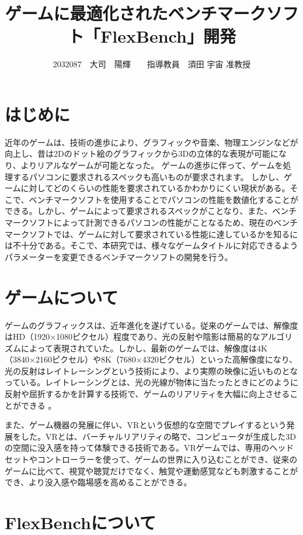 \documentclass[twocolumn,10pt,a4j]{ltjsarticle}
\title{ゲームに最適化されたベンチマークソフト「FlexBench」開発}
\author{2032087　大司　陽輝　　指導教員　須田 宇宙 准教授}
\date{}
\begin{document}
\maketitle

\section{はじめに}

近年のゲームは、技術の進歩により、グラフィックや音楽、物理エンジンなどが向上し、昔は2Dのドット絵のグラフィックから3Dの立体的な表現が可能になり、よりリアルなゲームが可能となった。
ゲームの進歩に伴って、ゲームを処理するパソコンに要求されるスペックも高いものが要求されます。
しかし、ゲームに対してどのくらいの性能を要求されているかわかりにくい現状がある。そこで、ベンチマークソフトを使用することでパソコンの性能を数値化することができる。しかし、ゲームによって要求されるスペックがことなり、また、ベンチマークソフトによって計測できるパソコンの性能がことなるため、現在のベンチマークソフトでは、ゲームに対して要求されている性能に達しているかを知るには不十分である。そこで、本研究では、様々なゲームタイトルに対応できるようパラメーターを変更できるベンチマークソフトの開発を行う。

\section{ゲームについて}
ゲームのグラフィックスは、近年進化を遂げている。従来のゲームでは、解像度はHD（1920×1080ピクセル）程度であり、光の反射や陰影は簡易的なアルゴリズムによって表現されていた。しかし、最新のゲームでは、解像度は4K（3840×2160ピクセル）や8K（7680×4320ピクセル）といった高解像度になり、光の反射はレイトレーシングという技術により、より実際の映像に近いものとなっている。レイトレーシングとは、光の光線が物体に当たったときにどのように反射や屈折するかを計算する技術で、ゲームのリアリティを大幅に向上させることができる 。

また、ゲーム機器の発展に伴い、VRという仮想的な空間でプレイするという発展をした。VRとは、バーチャルリアリティの略で、コンピュータが生成した3Dの空間に没入感を持って体験できる技術である。VRゲームでは、専用のヘッドセットやコントローラーを使って、ゲームの世界に入り込むことができ、従来のゲームに比べて、視覚や聴覚だけでなく、触覚や運動感覚なども刺激することができ、より没入感や臨場感を高めることができる。

\section{FlexBenchについて}
\end{document}
